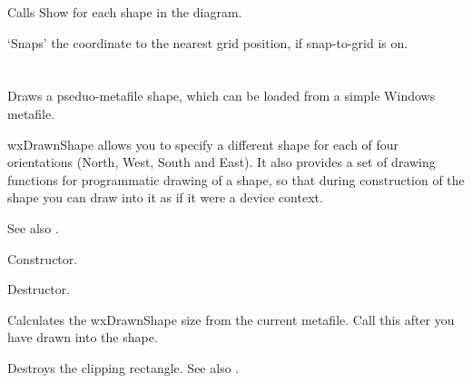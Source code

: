 Calls Show for each shape in the diagram.



`Snaps' the coordinate to the nearest grid position, if snap-to-grid is on.

\section{}\label{wxdrawnshape}

Draws a pseduo-metafile shape, which can be loaded from a simple Windows metafile.

wxDrawnShape allows you to specify a different shape for each of four orientations (North, West,
South and East). It also provides a set of drawing functions for programmatic drawing of a shape,
so that during construction of the shape you can draw into it as if it were a device context.



See also .




Constructor.



Destructor.



Calculates the wxDrawnShape size from the current metafile. Call this after you have drawn
into the shape.

\label{wxdrawnshapedestroyclippingrect}


Destroys the clipping rectangle. See also .

\label{wxdrawnshapedrawarc}

